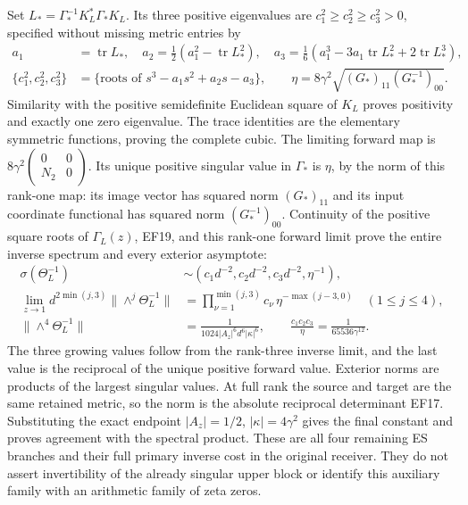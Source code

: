 Set $L_*=\Gamma_*^{-1}K_L^*\Gamma_*K_L$.
Its three positive eigenvalues are $c_1^2\ge c_2^2\ge c_3^2>0$,
specified without missing metric entries by
\begin{equation}
\begin{aligned}
 a_1&=\operatorname{tr}L_*,\quad
 a_2=\tfrac12(a_1^2-\operatorname{tr}L_*^2),\quad
 a_3=\tfrac16(a_1^3-3a_1\operatorname{tr}L_*^2+2\operatorname{tr}L_*^3),\\
 \{c_1^2,c_2^2,c_3^2\}&=
    \{\text{roots of }s^3-a_1s^2+a_2s-a_3\},\qquad
 \eta=8\gamma^2\sqrt{(G_*)_{11}(G_*^{-1})_{00}}.
\end{aligned}\tag{EF21}
\end{equation}
Similarity with the positive semidefinite Euclidean
square of $K_L$ proves positivity and exactly one zero
eigenvalue. The trace identities are the elementary
symmetric functions, proving the complete cubic.
The limiting forward map is
$8\gamma^2\left(\begin{smallmatrix}0&0\\N_2&0\end{smallmatrix}\right)$.
Its unique positive singular value in $\Gamma_*$ is
$\eta$, by the norm of this rank-one map: its image
vector has squared norm $(G_*)_{11}$ and its input
coordinate functional has squared norm $(G_*^{-1})_{00}$.
Continuity of the positive square roots of $\Gamma_L(z)$,
EF19, and this rank-one forward limit prove the entire
inverse spectrum and every exterior asymptote:
\begin{equation}
\begin{aligned}
 \sigma(\Theta_L^{-1})&\sim
       (c_1d^{-2},c_2d^{-2},c_3d^{-2},\eta^{-1}),\\
 \lim_{z\to1}d^{2\min(j,3)}\|\wedge^j\Theta_L^{-1}\|
       &=\prod_{\nu=1}^{\min(j,3)}c_\nu\,
           \eta^{-\max(j-3,0)}\quad(1\le j\le4),\\
 \|\wedge^4\Theta_L^{-1}\|
       &=\frac1{1024|A_z|^6d^6|\kappa|^6},\qquad
 \frac{c_1c_2c_3}{\eta}=\frac1{65536\gamma^{12}}.
\end{aligned}\tag{EF22}
\end{equation}
The three growing values follow from the rank-three
inverse limit, and the last value is the reciprocal
of the unique positive forward value. Exterior norms
are products of the largest singular values. At full
rank the source and target are the same retained
metric, so the norm is the absolute reciprocal
determinant EF17. Substituting the exact endpoint
$|A_z|=1/2$, $|\kappa|=4\gamma^2$ gives the final
constant and proves agreement with the spectral product.
These are all four remaining ES branches and their
full primary inverse cost in the original receiver.
They do not assert invertibility of the already
singular upper block or identify this auxiliary
family with an arithmetic family of zeta zeros.

